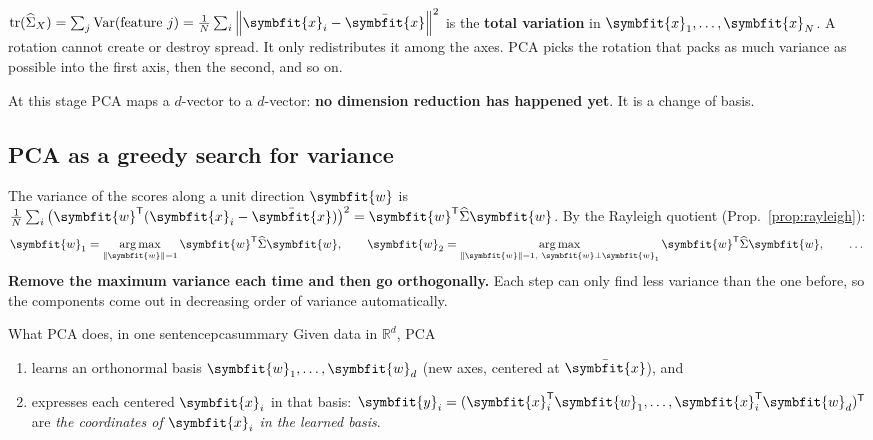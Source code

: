 \documentclass[11pt]{article}
\newcommand{\bm}[1]{\symbfit{#1}}
\newcommand{\R}{\mathbb{R}}
\newcommand{\vx}{\bm{x}}
\newcommand{\vy}{\bm{y}}
\newcommand{\vw}{\bm{w}}
\newcommand{\xbar}{\bar{\bm{x}}}
\newcommand{\Sig}{\widehat{\Sigma}}
\newcommand{\T}{^{\mathsf T}}
\newcommand{\tr}{\operatorname{tr}}
\newcommand{\norm}[1]{\left\lVert #1\right\rVert}
\DeclareMathOperator*{\argmax}{arg\,max}
\begin{document}
\begin{intuition}
$\tr(\Sig_X)=\sum_j\operatorname{Var}(\text{feature } j)=\frac1N\sum_i\norm{\vx_i-\xbar}^2$
is the \textbf{total variation} in $\vx_1,\dots,\vx_N$. A rotation cannot create or
destroy spread. It only redistributes it among the axes. PCA picks the rotation that
packs as much variance as possible into the first axis, then the second, and so on.

At this stage PCA maps a $d$-vector to a $d$-vector: \textbf{no dimension reduction
has happened yet}. It is a change of basis.
\end{intuition}

\subsection{PCA as a greedy search for variance}

The variance of the scores along a unit direction $\vw$ is
$\frac1N\sum_i\big(\vw\T(\vx_i-\xbar)\big)^2=\vw\T\Sig\vw$. By the Rayleigh quotient
(Prop.~\ref{prop:rayleigh}):
\[
\vw_1=\argmax_{\norm{\vw}=1}\vw\T\Sig\vw,\qquad
\vw_2=\argmax_{\norm{\vw}=1,\ \vw\perp\vw_1}\vw\T\Sig\vw,\qquad\dots
\]
\textbf{Remove the maximum variance each time and then go orthogonally.} Each step can
only find less variance than the one before, so the components come out in decreasing
order of variance automatically.

\begin{theorem}{What PCA does, in one sentence}{pcasummary}
Given data in $\R^d$, PCA
\begin{enumerate}[nosep,label=\arabic*)]
\item learns an orthonormal basis $\vw_1,\dots,\vw_d$ (new axes, centered at $\xbar$), and
\item expresses each centered $\vx_i$ in that basis: $\vy_i=(\vx_i\T\vw_1,\dots,\vx_i\T\vw_d)\T$
are \emph{the coordinates of $\vx_i$ in the learned basis}.
\end{enumerate}
\end{theorem}
\end{document}
